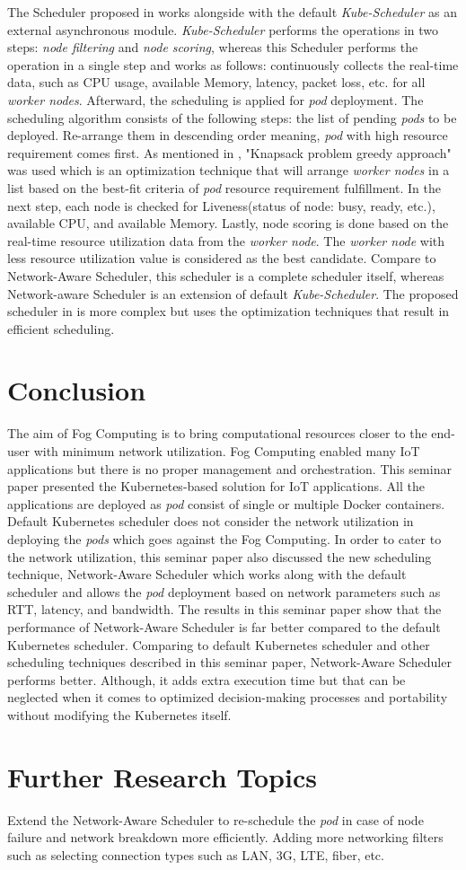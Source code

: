   The Scheduler proposed in \cite{8903766} works alongside with the default \emph{Kube-Scheduler} as an external asynchronous module. \emph{Kube-Scheduler} performs the operations in two steps: \emph{node filtering} and \emph{node scoring}, whereas this Scheduler\cite{8903766} performs the operation in a single step and works as follows: continuously collects the real-time data, such as CPU usage, available Memory, latency, packet loss, etc.  for all \emph{worker nodes}. Afterward, the scheduling is applied for \emph{pod} deployment. The scheduling algorithm consists of the following steps\cite{8903766}: the list of pending \emph{pods} to be deployed. Re-arrange them in descending order meaning, \emph{pod} with high resource requirement comes first. As mentioned in \cite{8903766}, "Knapsack problem greedy approach" was used which is an optimization technique that will arrange \emph{worker nodes} in a list based on the best-fit criteria of \emph{pod} resource requirement fulfillment. In the next step, each node is checked for Liveness(status of node: busy, ready, etc.), available CPU, and available Memory\cite{8903766}. Lastly, node scoring is done based on the real-time resource utilization data from the \emph{worker node}\cite{8903766}. The \emph{worker node} with less resource utilization value is considered as the best candidate\cite{8903766}. Compare to Network-Aware Scheduler\cite{Santos2019}, this scheduler\cite{8903766} is a complete scheduler itself, whereas Network-aware Scheduler\cite{Santos2019} is an extension of default \emph{Kube-Scheduler}. The proposed scheduler in \cite{8903766} is more complex but uses the optimization techniques that result in efficient scheduling.
  \section{Conclusion}
  \label{sec:concl}
  The aim of Fog Computing is to bring computational resources closer to the end-user with minimum network utilization. Fog Computing enabled many IoT applications but there is no proper management and orchestration. This seminar paper presented the Kubernetes-based solution for IoT applications. All the applications are deployed as \emph{pod} consist of single or multiple Docker containers. Default Kubernetes scheduler does not consider the network utilization in deploying the \emph{pods} which goes against the Fog Computing. In order to cater to the network utilization, this seminar paper also discussed the new scheduling technique, Network-Aware Scheduler which works along with the default scheduler and allows the \emph{pod} deployment based on network parameters such as RTT, latency, and bandwidth. The results in this seminar paper show that the performance of Network-Aware Scheduler is far better compared to the default Kubernetes scheduler. Comparing to default Kubernetes scheduler and other scheduling techniques described in this seminar paper, Network-Aware Scheduler performs better. Although, it adds extra execution time but that can be neglected when it comes to optimized decision-making processes and portability without modifying the Kubernetes itself.  
  \section{Further Research Topics}
  \label{sec:research}
  Extend the Network-Aware Scheduler to re-schedule the \emph{pod} in case of node failure and network breakdown more efficiently. Adding more networking filters such as selecting connection types such as LAN, 3G, LTE, fiber, etc.